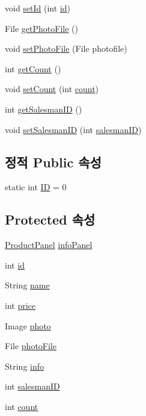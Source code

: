 \begin{DoxyCompactItemize}
\item 
void \hyperlink{classpkg_1_1_product_a996243e4823ae5f76f58e30a03d34eb9}{set\+Id} (int \hyperlink{classpkg_1_1_product_ac7846687b2d11faba3be1395fcbbab72}{id})
\item 
File \hyperlink{classpkg_1_1_product_a764578798cef5634d2af3044ab922977}{get\+Photo\+File} ()
\item 
void \hyperlink{classpkg_1_1_product_a5e82724d52edee89a9d1b27c10ef6c40}{set\+Photo\+File} (File photofile)
\item 
int \hyperlink{classpkg_1_1_product_ab7dd82a1b245dba43a64cd232f3665f6}{get\+Count} ()
\item 
void \hyperlink{classpkg_1_1_product_acb0a299e85f03854235433410489ab66}{set\+Count} (int \hyperlink{classpkg_1_1_product_ac136af1e8637edc22218dd9c3383266b}{count})
\item 
int \hyperlink{classpkg_1_1_product_a5f82183f3895907190290282addf4b93}{get\+Salesman\+ID} ()
\item 
void \hyperlink{classpkg_1_1_product_ac88412453ad90154a2ce712df900149f}{set\+Salesman\+ID} (int \hyperlink{classpkg_1_1_product_aecf411b201022fca17571e9afbc76747}{salesman\+ID})
\end{DoxyCompactItemize}
\subsection*{정적 Public 속성}
\begin{DoxyCompactItemize}
\item 
static int \hyperlink{classpkg_1_1_product_a228b3c9d89ad6a4f6637bf1f6f74ff64}{ID} = 0
\end{DoxyCompactItemize}
\subsection*{Protected 속성}
\begin{DoxyCompactItemize}
\item 
\hyperlink{classpkg_1_1_product_panel}{Product\+Panel} \hyperlink{classpkg_1_1_product_a6755de182d9383bc860fa44a8a01789d}{info\+Panel}
\item 
int \hyperlink{classpkg_1_1_product_ac7846687b2d11faba3be1395fcbbab72}{id}
\item 
String \hyperlink{classpkg_1_1_product_acdadb9558664acdfd23eff5b2b77ae90}{name}
\item 
int \hyperlink{classpkg_1_1_product_a46c6eb6906d4ee2f6393515f41dba7c9}{price}
\item 
Image \hyperlink{classpkg_1_1_product_a5d279eb4556860b90305cc26a3ee69be}{photo}
\item 
File \hyperlink{classpkg_1_1_product_a2eeaba74c302ecdc9dd288ff7527ac67}{photo\+File}
\item 
String \hyperlink{classpkg_1_1_product_ade3d909a0e7d15ec98c2f27eecd637cd}{info}
\item 
int \hyperlink{classpkg_1_1_product_aecf411b201022fca17571e9afbc76747}{salesman\+ID}
\item 
int \hyperlink{classpkg_1_1_product_ac136af1e8637edc22218dd9c3383266b}{count}
\end{DoxyCompactItemize}


